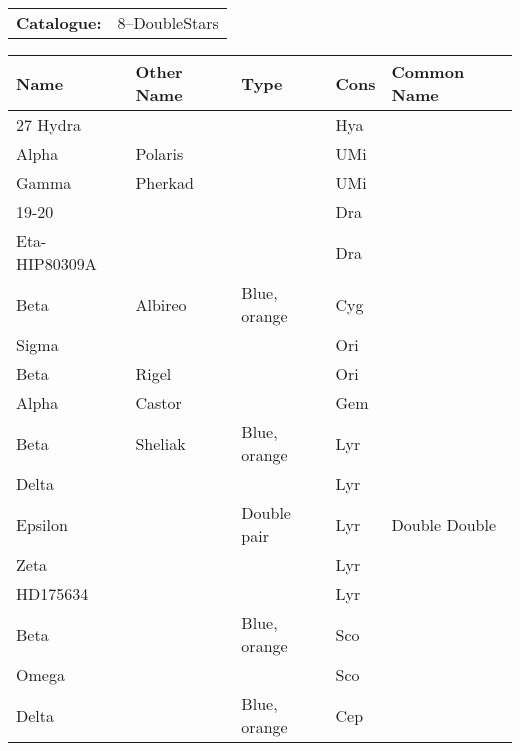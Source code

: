 \begin{tabular}{ p{0.9in} p{1.3in}}
{\bf Catalogue:} & 8--DoubleStars \\ 
\end{tabular}
\begin{longtable}{ p{0.7in}  p{1.0in}  p{0.6in}  p{0.9in}  p{5.1in} }
\hline 
{\bf Name} & {\bf Other Name} & {\bf Type} & {\bf Cons} & {\bf Common Name} \\ 
\hline 
27 Hydra &  &  & Hya &  \\ 
Alpha & Polaris &  & UMi &  \\ 
Gamma & Pherkad &  & UMi &  \\ 
19-20 &  &  & Dra &  \\ 
Eta-HIP80309A &  &  & Dra &  \\ 
Beta & Albireo & Blue, orange & Cyg &  \\ 
Sigma &  &  & Ori &  \\ 
Beta & Rigel &  & Ori &  \\ 
Alpha & Castor &  & Gem &  \\ 
Beta & Sheliak & Blue, orange & Lyr &  \\ 
Delta &  &  & Lyr &  \\ 
Epsilon &  & Double pair & Lyr & Double Double \\ 
Zeta &  &  & Lyr &  \\ 
HD175634 &  &  & Lyr &  \\ 
Beta &  & Blue, orange & Sco &  \\ 
Omega &  &  & Sco &  \\ 
Delta &  & Blue, orange & Cep &  \\ 
\hline 
\end{longtable} 
